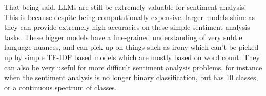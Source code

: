 \documentclass[10pt,twocolumn,letterpaper]{article}
\begin{document}
That being said, LLMs are still be extremely valuable for sentiment analysis! This is because despite being computationally expensive, larger models shine as they can provide extremely high accuracies \cite{paperswithcode} on these simple sentiment analysis tasks. These bigger models have a fine-grained understanding of very subtle language nuances, and can pick up on things such as irony which can't be picked up by simple TF-IDF based models which are mostly based on word count. They can also be very useful for more difficult sentiment analysis problems, for instance when the sentiment analysis is no longer binary classification, but has 10 classes, or a continuous spectrum of classes.

















\end{document}
